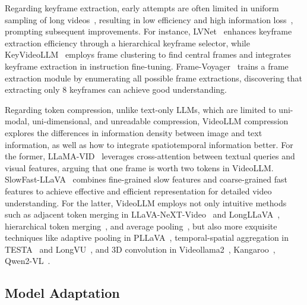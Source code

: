 Regarding keyframe extraction, early attempts are often limited in uniform sampling of long videos~\citep{zhang2024llavanextvideo,cheng2024videollama}, resulting in low efficiency and high information loss~\citep{shen2024longvu}, prompting subsequent improvements. For instance, LVNet~\citep{park2024too} enhances keyframe extraction efficiency through a hierarchical keyframe selector, while KeyVideoLLM~\citep{liang2024keyvideollm} employs frame clustering to find central frames and integrates keyframe extraction in instruction fine-tuning. Frame-Voyager~\citep{yu2024frame} trains a frame extraction module by enumerating all possible frame extractions, discovering that extracting only 8 keyframes can achieve good understanding.

Regarding token compression, unlike text-only LLMs, which are limited to uni-modal, uni-dimensional, and unreadable compression, VideoLLM compression explores the differences in information density between image and text information, as well as how to integrate spatiotemporal information better. For the former, LLaMA-VID~\citep{li2025llama} leverages cross-attention between textual queries and visual features, arguing that one frame is worth two tokens in VideoLLM. SlowFast-LLaVA~\citep{xu2024slowfast} combines fine-grained slow features and coarse-grained fast features to achieve effective and efficient representation for detailed video understanding. For the latter, VideoLLM employs not only intuitive methods such as adjacent token merging in LLaVA-NeXT-Video~\citep{zhang2024llavanextvideo} and LongLLaVA~\citep{wang2024longllava}, hierarchical token merging~\citep{weng2025longvlm}, and average pooling~\citep{cai2024matryoshka}, but also more exquisite techniques like adaptive pooling in PLLaVA~\citep{xu2024pllava}, temporal-spatial aggregation in TESTA~\citep{ren2023testa} and LongVU~\citep{shen2024longvu}, and 3D convolution in Videollama2~\citep{cheng2024videollama}, Kangaroo~\citep{liu2024kangaroo}, Qwen2-VL~\citep{wang2024qwen2}.

\subsection{Model Adaptation}\label{sec10_2} 

